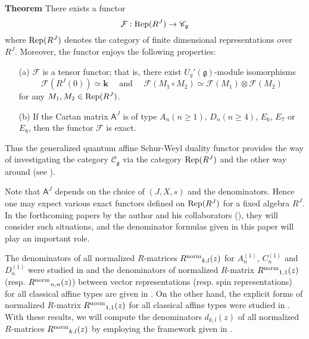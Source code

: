 \documentclass[11pt, leqno]{amsart}
\theoremstyle{definition}
\numberwithin{equation}{section}
\begin{document}
\noindent
\textbf{Theorem} \cite{KKK13a}
 There exists a functor
$$\mathcal{F} : {{\rm Rep}}(R^J) \rightarrow \mathscr{C}_{\mathfrak g} $$
where ${{\rm Rep}}(R^J)$ denotes the category of finite dimensional representations over $R^J$.
Moreover, the functor enjoys the following properties:
\begin{enumerate}
\item[({\rm a})] $\mathcal{F}$ is a tensor functor; that is, there exist $U_q'({\mathfrak g})$-module isomorphisms
$$\mathcal{F}(R^J(0)) \simeq {\mathbf{k}} \quad \text{ and } \quad \mathcal{F}(M_1 \circ M_2) \simeq \mathcal{F}(M_1) {\mathop\otimes} \mathcal{F}(M_2)$$
for any $M_1, M_2 \in {{\rm Rep}}(R^J)$.
\item[({\rm b})] If the Cartan matrix ${\mathsf{A}}^J$ is of type $A_n(n \ge 1)$, $D_n(n \ge 4)$, $E_6$, $E_7$ or $E_8$, then
the functor $\mathcal{F}$ is exact.
\end{enumerate}
\medskip

Thus the  generalized quantum affine Schur-Weyl duality functor provides the way of investigating the category $\mathscr{C}_{\mathfrak g} $
via the category ${{\rm Rep}}(R^J)$ and the other way around (see \cite{KKKO14}).

Note that ${\mathsf{A}}^J$ depends on the choice of $(J,X,s)$ and the denominators. Hence one may expect various exact functors
defined on ${{\rm Rep}}(R^J)$ for a fixed algebra $R^J$. In the forthcoming papers by the author and his collaborators
(\cite{KKKO14A,KKKO14D}), they will consider such situations, and the denominator formulas given in this paper will play
an important role.

The denominators of all normalized $R$-matrices ${R^{\rm{norm}}}_{k,l}(z)$
for $A^{(1)}_{n}$, $C^{(1)}_{n}$ and $D^{(1)}_{n}$ were studied in \cite{AK,DO94,KKK13b} and
the denominators of normalized $R$-matrix ${R^{\rm{norm}}}_{1,1}(z)$ (resp. ${R^{\rm{norm}}}_{n,n}(z)$)
between vector representations (resp. spin representations) for all classical affine types are given in \cite{KMN2,Okado90}.
On the other hand, the explicit forms of normalized $R$-matrix ${R^{\rm{norm}}}_{1,1}(z)$ for all classical affine types were studied in \cite{DO96,HYZ,J86,JMO00}.
With these results, we will compute the denominators $d_{k,l}(z)$ of all normalized $R$-matrices ${R^{\rm{norm}}}_{k,l}(z)$ by employing
the framework given in \cite[Appendix A]{KKK13b}.
\end{document}

